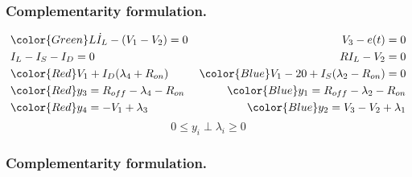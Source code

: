  \frame
{
\frametitle{Complementarity formulation.}

\begin{figure}
   \centerline{
   \scalebox{0.8}{
    
    }
 } 
 \end{figure}

  
 \begin{eqnarray*}
 &{\color{Green}L\dot I_L -(V_1-V_2)=0}&V_3-e(t)=0\\
 &I_L-I_S-I_D=0&RI_L-V_2=0\\
 &{\color{Red}V_1+I_D(\lambda _4 +R_{on})}&{\color{Blue}V_1-20+I_S(\lambda _2 - R_{on})=0}\\
 &{\color{Red}y_3=R_{off}-\lambda _4 - R_{on}}&{\color{Blue}y_1=R_{off}-\lambda _2-R_{on}}\\
 &{\color{Red}y_4=-V_1+\lambda _3}&{\color{Blue}y_2=V_3-V_2+\lambda _1}\\
 \end{eqnarray*}
 \[0 \leq y_i \perp \lambda _i \geq 0\]
 }

\frame
{

\frametitle{Complementarity formulation.}
 \begin{figure}
   
 \end{figure}

 }

